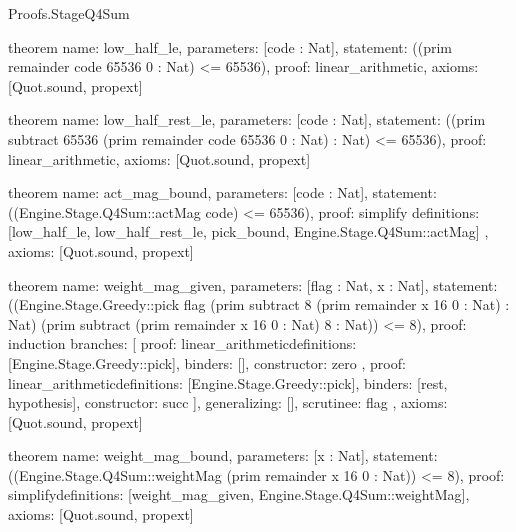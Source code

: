 \begin{lexlean}{Proofs.StageQ4Sum}
\begin{semanticmodule}
theorem{
  name: low_half_le,
  parameters: [code : Nat],
  statement: ((prim remainder code 65536 0 : Nat) <= 65536),
  proof: linear_arithmetic{},
  axioms: [Quot.sound, propext]
}

theorem{
  name: low_half_rest_le,
  parameters: [code : Nat],
  statement: ((prim subtract 65536 (prim remainder code 65536 0 : Nat) : Nat) <= 65536),
  proof: linear_arithmetic{},
  axioms: [Quot.sound, propext]
}

theorem{
  name: act_mag_bound,
  parameters: [code : Nat],
  statement: ((Engine.Stage.Q4Sum::actMag code) <= 65536),
  proof: simplify{
    definitions: [low_half_le, low_half_rest_le, pick_bound, Engine.Stage.Q4Sum::actMag]
  },
  axioms: [Quot.sound, propext]
}

theorem{
  name: weight_mag_given,
  parameters: [flag : Nat, x : Nat],
  statement: ((Engine.Stage.Greedy::pick flag (prim subtract 8 (prim remainder x 16 0 : Nat) : Nat) (prim subtract (prim remainder x 16 0 : Nat) 8 : Nat)) <= 8),
  proof: induction{
    branches: [
      {
        proof: linear_arithmetic{definitions: [Engine.Stage.Greedy::pick]},
        binders: [],
        constructor: zero
      },
      {
        proof: linear_arithmetic{definitions: [Engine.Stage.Greedy::pick]},
        binders: [rest, hypothesis],
        constructor: succ
      }
    ],
    generalizing: [],
    scrutinee: flag
  },
  axioms: [Quot.sound, propext]
}

theorem{
  name: weight_mag_bound,
  parameters: [x : Nat],
  statement: ((Engine.Stage.Q4Sum::weightMag (prim remainder x 16 0 : Nat)) <= 8),
  proof: simplify{definitions: [weight_mag_given, Engine.Stage.Q4Sum::weightMag]},
  axioms: [Quot.sound, propext]
}


\end{semanticmodule}
\end{lexlean}
